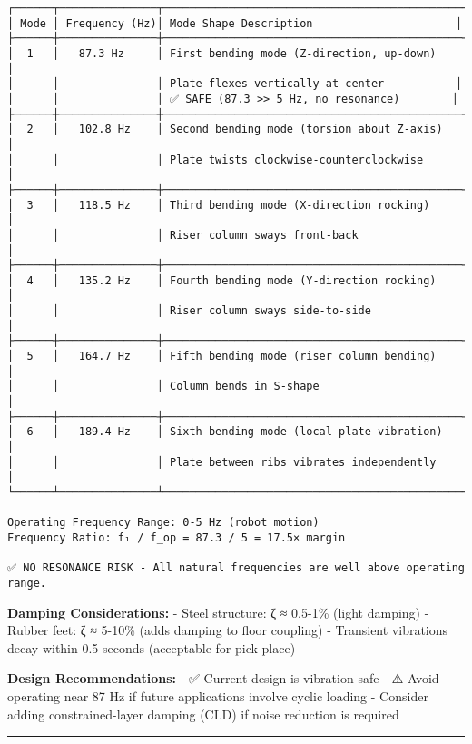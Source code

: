 \documentclass[
]{article}
\begin{document}
\begin{verbatim}
┌──────┬───────────────┬──────────────────────────────────────────────┐
│ Mode │ Frequency (Hz)│ Mode Shape Description                      │
├──────┼───────────────┼──────────────────────────────────────────────┤
│  1   │   87.3 Hz     │ First bending mode (Z-direction, up-down)    │
│      │               │ Plate flexes vertically at center           │
│      │               │ ✅ SAFE (87.3 >> 5 Hz, no resonance)        │
├──────┼───────────────┼──────────────────────────────────────────────┤
│  2   │   102.8 Hz    │ Second bending mode (torsion about Z-axis)   │
│      │               │ Plate twists clockwise-counterclockwise      │
├──────┼───────────────┼──────────────────────────────────────────────┤
│  3   │   118.5 Hz    │ Third bending mode (X-direction rocking)     │
│      │               │ Riser column sways front-back                │
├──────┼───────────────┼──────────────────────────────────────────────┤
│  4   │   135.2 Hz    │ Fourth bending mode (Y-direction rocking)    │
│      │               │ Riser column sways side-to-side              │
├──────┼───────────────┼──────────────────────────────────────────────┤
│  5   │   164.7 Hz    │ Fifth bending mode (riser column bending)    │
│      │               │ Column bends in S-shape                      │
├──────┼───────────────┼──────────────────────────────────────────────┤
│  6   │   189.4 Hz    │ Sixth bending mode (local plate vibration)   │
│      │               │ Plate between ribs vibrates independently    │
└──────┴───────────────┴──────────────────────────────────────────────┘

Operating Frequency Range: 0-5 Hz (robot motion)
Frequency Ratio: f₁ / f_op = 87.3 / 5 = 17.5× margin

✅ NO RESONANCE RISK - All natural frequencies are well above operating range.
\end{verbatim}

\textbf{Damping Considerations:} - Steel structure: ζ ≈ 0.5-1\% (light
damping) - Rubber feet: ζ ≈ 5-10\% (adds damping to floor coupling) -
Transient vibrations decay within 0.5 seconds (acceptable for
pick-place)

\textbf{Design Recommendations:} - ✅ Current design is vibration-safe -
⚠️ Avoid operating near 87 Hz if future applications involve cyclic
loading - Consider adding constrained-layer damping (CLD) if noise
reduction is required

\begin{center}\rule{0.5\linewidth}{0.5pt}\end{center}
\end{document}
